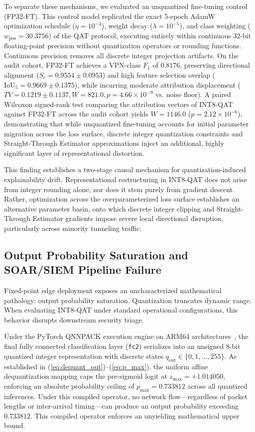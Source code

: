 \documentclass[conference]{IEEEtran}
\begin{document}
To separate these mechanisms, we evaluated an unquantized fine-tuning control (FP32-FT). This control model replicated the exact 5-epoch AdamW optimization schedule ($\eta = 10^{-4}$), weight decay ($\lambda = 10^{-5}$), and class weighting ($w_{\text{pos}} = 30.3756$) of the QAT protocol, executing entirely within continuous 32-bit floating-point precision without quantization operators or rounding functions. Continuous precision removes all discrete integer projection artifacts. On the audit cohort, FP32-FT achieves a VPN-class $F_1$ of $0.8176$, preserving directional alignment ($S_c = 0.9554 \pm 0.0953$) and high feature selection overlap ($\text{IoU}_5 = 0.9669 \pm 0.1375$), while incurring moderate attribution displacement ($TV = 0.1219 \pm 0.1137, W = 821.0, p = 4.66 \times 10^{-9}$ vs. noise floor). A paired Wilcoxon signed-rank test comparing the attribution vectors of INT8-QAT against FP32-FT across the audit cohort yields $W = 1146.0$ ($p = 2.12 \times 10^{-6}$), demonstrating that while unquantized fine-tuning accounts for initial parameter migration across the loss surface, discrete integer quantization constraints and Straight-Through Estimator approximations inject an additional, highly significant layer of representational distortion.

This finding establishes a two-stage causal mechanism for quantization-induced explainability drift. Representational restructuring in INT8-QAT does not arise from integer rounding alone, nor does it stem purely from gradient descent. Rather, optimization across the overparameterized loss surface establishes an alternative parameter basin, onto which discrete integer clipping and Straight-Through Estimator gradients impose severe local directional disruption, particularly across minority tunneling traffic.

\subsection{Output Probability Saturation and SOAR/SIEM Pipeline Failure}
Fixed-point edge deployment exposes an uncharacterized mathematical pathology: output probability saturation. Quantization truncates dynamic range. When evaluating INT8-QAT under standard operational configurations, this behavior disrupts downstream security triage.

Under the PyTorch QNNPACK execution engine on ARM64 architectures~\cite{b21}, the final fully connected classification layer (\texttt{fc2}) serializes into an unsigned 8-bit quantized integer representation with discrete states $q_{\text{out}} \in \{0, 1, \dots, 255\}$. As established in (\ref{eq:dequant_out})--(\ref{eq:p_max}), the uniform affine dequantization mapping caps the pre-sigmoid logit at $z_{\max} = +1.014050$, enforcing an absolute probability ceiling of $p_{\max} = 0.733812$ across all quantized inferences. Under this compiled operator, no network flow—regardless of packet lengths or inter-arrival timing—can produce an output probability exceeding $0.733812$. This compiled operator enforces an unyielding mathematical upper bound.
\end{document}
